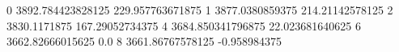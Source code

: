 0 3892.784423828125 229.957763671875
1 3877.0380859375 214.21142578125
2 3830.1171875 167.29052734375
4 3684.850341796875 22.023681640625
6 3662.82666015625 0.0
8 3661.86767578125 -0.958984375

